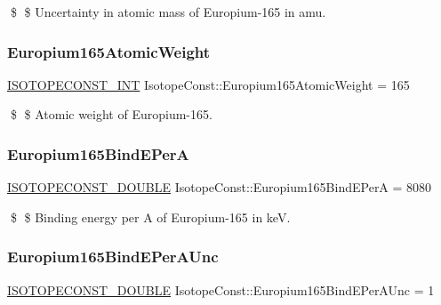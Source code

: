 \$ \$ Uncertainty in atomic mass of Europium-\/165 in amu. \mbox{\label{group___isotope_const-_europium-_eu165_ga6cdf8fa14f73a296321b93494ad4b990}} 
\subsubsection{\texorpdfstring{Europium165\+Atomic\+Weight}{Europium165AtomicWeight}}
{\footnotesize\ttfamily \mbox{\hyperlink{group___isotope_const-_macros_ga5f18360b3e99483a35c32d789e62621c}{I\+S\+O\+T\+O\+P\+E\+C\+O\+N\+S\+T\+\_\+\+I\+NT}} Isotope\+Const\+::\+Europium165\+Atomic\+Weight = 165}

\$ \$ Atomic weight of Europium-\/165. \mbox{\label{group___isotope_const-_europium-_eu165_gad2dee9c79a654bb8a42c249014b854fa}} 
\subsubsection{\texorpdfstring{Europium165\+Bind\+E\+PerA}{Europium165BindEPerA}}
{\footnotesize\ttfamily \mbox{\hyperlink{group___isotope_const-_macros_ga8f45a7272ce02c0b4c65c44636ed719a}{I\+S\+O\+T\+O\+P\+E\+C\+O\+N\+S\+T\+\_\+\+D\+O\+U\+B\+LE}} Isotope\+Const\+::\+Europium165\+Bind\+E\+PerA = 8080}

\$ \$ Binding energy per A of Europium-\/165 in keV. \mbox{\label{group___isotope_const-_europium-_eu165_gad79924fe350bd9b5360c2a046d5d69bc}} 
\subsubsection{\texorpdfstring{Europium165\+Bind\+E\+Per\+A\+Unc}{Europium165BindEPerAUnc}}
{\footnotesize\ttfamily \mbox{\hyperlink{group___isotope_const-_macros_ga8f45a7272ce02c0b4c65c44636ed719a}{I\+S\+O\+T\+O\+P\+E\+C\+O\+N\+S\+T\+\_\+\+D\+O\+U\+B\+LE}} Isotope\+Const\+::\+Europium165\+Bind\+E\+Per\+A\+Unc = 1}

